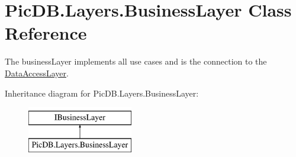 \hypertarget{class_pic_d_b_1_1_layers_1_1_business_layer}{}\section{Pic\+D\+B.\+Layers.\+Business\+Layer Class Reference}
\label{class_pic_d_b_1_1_layers_1_1_business_layer}


The business\+Layer implements all use cases and is the connection to the \mbox{\hyperlink{class_pic_d_b_1_1_layers_1_1_data_access_layer}{Data\+Access\+Layer}}.  


Inheritance diagram for Pic\+D\+B.\+Layers.\+Business\+Layer\+:\begin{figure}[H]
\begin{center}
\leavevmode
\includegraphics[height=2.000000cm]{class_pic_d_b_1_1_layers_1_1_business_layer}
\end{center}
\end{figure}
